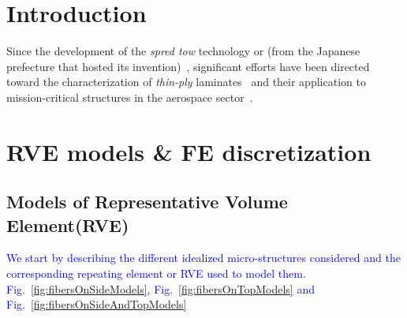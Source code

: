 \documentclass[review]{elsarticle}
\begin{document}
\linenumbers

\section{Introduction}

Since the development of the \emph{spred tow} technology or  (from the Japanese prefecture that hosted its invention)~\cite{Kawabe2008,Kawabe2008en}, significant efforts have been directed toward the characterization of \emph{thin-ply} laminates~\cite{Sasayama2003,Yamaguchi2005,Tsai2005,Sihn2007,Yokozeki2008,Yokozeki2010,Saito2012,Arteiro2013,Arteiro2014,Amacher2014,Guillamet2014,Huang2018,Cugnoni2018} and their application to mission-critical structures in the aerospace sector~\cite{Moon2011,Kim2017,Kopp2017,McCarville2018}.

\section{RVE models \& FE discretization}

\subsection{Models of Representative Volume Element(RVE)}

\textcolor{blue}{We start by describing the different idealized micro-structures considered and the corresponding repeating element or RVE used to model them. Fig.~\ref{fig:fibersOnSideModels}, Fig.~\ref{fig:fibersOnTopModels} and Fig.~\ref{fig:fibersOnSideAndTopModels}}
\end{document}
